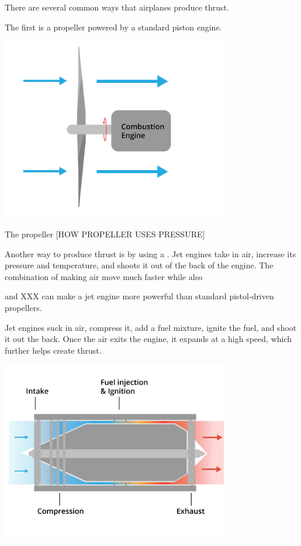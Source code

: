 There are several common ways that airplanes produce thrust.

The first is a propeller powered by a standard piston engine.

\begin{center}
    \includegraphics[width=0.75\textwidth]{propeller.png}
    
\end{center}

The propeller [HOW PROPELLER USES PRESSURE]


Another way to produce thrust is by using a . Jet engines take in air, increase its pressure and temperature, and shoots it out of the back of the engine. The combination of making air move much faster while also 

and XXX can make a jet engine more powerful than standard pistol-driven propellers. 


Jet engines suck in air, compress it, add a fuel mixture, ignite the fuel, and shoot it out the back. Once the air exits the engine, it expands at a high speed, which further helps create thrust. 




\begin{center}
    \includegraphics[width=0.75\textwidth]{jet.png}
    
\end{center}

